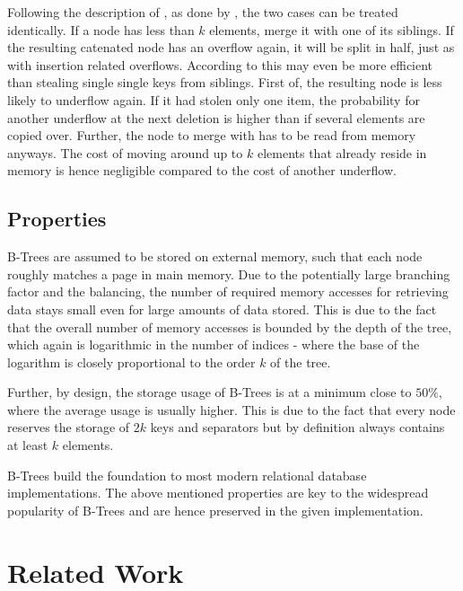 Following the description of \parencite{DBLP:journals/acta/BayerM72},
as done by \parencite{Fielding80},
the two cases can be treated identically.
If a node has less than $k$ elements,
merge it with one of its siblings.
If the resulting catenated node has an overflow again,
it will be split in half, just as with insertion related overflows.
According to \parencite{DBLP:journals/csur/Comer79} this may even be
more efficient than stealing single single keys from siblings.
First of, the resulting node is less likely to underflow again.
If it had stolen only one item, the probability for another underflow at the next
deletion is higher than if several elements are copied over.
Further, the node to merge with has to be read from memory anyways.
The cost of moving around up to $k$ elements that already reside in memory
is hence negligible compared to the cost of another underflow.


\subsection{Properties}

B-Trees are assumed to be stored on external memory,
such that each node roughly matches a page in main memory.
Due to the potentially large branching factor and the balancing,
the number of required memory accesses for retrieving data stays small even for
large amounts of data stored.
This is due to the fact that the overall number of memory accesses is bounded by the depth
of the tree, which again is logarithmic in the number of indices -
where the base of the logarithm is closely proportional to the order $k$ of the tree.

Further, by design, the storage usage of B-Trees is at a minimum close to $50\%$,
where the average usage is usually higher. \parencite{DBLP:journals/acta/BayerM72}
This is due to the fact that every node reserves the storage of $2k$ keys and separators
but by definition always contains at least $k$ elements.

B-Trees build the foundation to most modern relational database implementations.
The above mentioned properties are key to the widespread popularity of B-Trees and are
hence preserved in the given implementation.

\section{Related Work}

